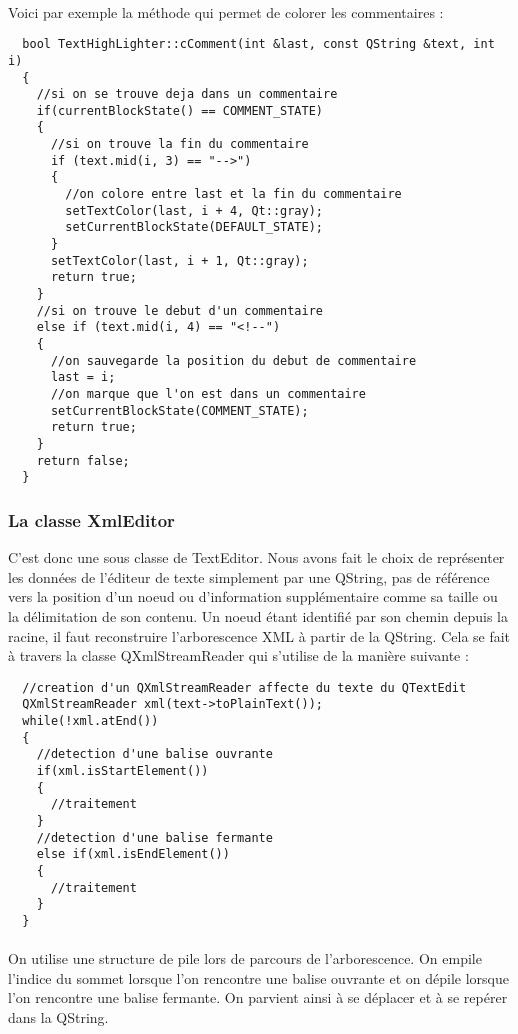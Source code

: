 \paragraph{}
Voici par exemple la méthode qui permet de colorer les commentaires :
\begin{lstlisting}
  bool TextHighLighter::cComment(int &last, const QString &text, int i)
  {
    //si on se trouve deja dans un commentaire
    if(currentBlockState() == COMMENT_STATE)
    {
      //si on trouve la fin du commentaire
      if (text.mid(i, 3) == "-->")
      {
        //on colore entre last et la fin du commentaire
        setTextColor(last, i + 4, Qt::gray);
        setCurrentBlockState(DEFAULT_STATE);
      }
      setTextColor(last, i + 1, Qt::gray);
      return true;
    }
    //si on trouve le debut d'un commentaire
    else if (text.mid(i, 4) == "<!--")
    {
      //on sauvegarde la position du debut de commentaire
      last = i;
      //on marque que l'on est dans un commentaire
      setCurrentBlockState(COMMENT_STATE);
      return true;
    }
    return false;
  }
\end{lstlisting}
\paragraph{}
\subsubsection{La classe XmlEditor}

C'est donc une sous classe de TextEditor. Nous avons fait le choix de représenter les données de l'éditeur de texte simplement par une QString, pas de référence vers la position d'un noeud ou d'information supplémentaire comme sa taille ou la délimitation de son contenu.
Un noeud étant identifié par son chemin depuis la racine, il faut reconstruire l'arborescence XML à partir de la QString. Cela se fait à travers la classe QXmlStreamReader qui s'utilise de la manière suivante :
\begin{lstlisting}
  //creation d'un QXmlStreamReader affecte du texte du QTextEdit
  QXmlStreamReader xml(text->toPlainText());
  while(!xml.atEnd())
  {
    //detection d'une balise ouvrante
    if(xml.isStartElement())
    {
      //traitement
    }
    //detection d'une balise fermante
    else if(xml.isEndElement())
    {
      //traitement
    }
  }
\end{lstlisting}
\paragraph{}
On utilise une structure de pile lors de parcours de l'arborescence. On empile l'indice du sommet lorsque l'on rencontre une balise ouvrante et on dépile lorsque l'on rencontre une balise fermante.
On parvient ainsi à se déplacer et à se repérer dans la QString.


